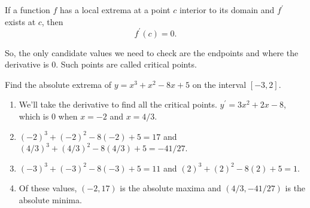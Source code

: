 \begin{theorem}
	If a function $f$ has a local extrema at a point $c$ interior to its domain and $f^\prime$ exists at $c$, then
	\begin{equation*}
		f^\prime(c) = 0.
	\end{equation*}
\end{theorem}

So, the only candidate values we need to check are the endpoints and where the derivative is 0.
Such points are called critical points.

\begin{example}
	Find the absolute extrema of $y = x^3 + x^2 - 8x + 5$ on the interval $[-3,2]$.
\end{example}
\begin{answer}
	\begin{enumerate}
		\item We'll take the derivative to find all the critical points.
				$y^\prime = 3x^2 + 2x - 8$, which is 0 when $x=-2$ and $x=4/3$.
		\item $(-2)^3 + (-2)^2 - 8(-2) + 5 = 17$ and $(4/3)^3 + (4/3)^2 - 8(4/3) + 5 = -41/27$.
		\item $(-3)^3 + (-3)^2 - 8(-3) + 5 = 11$ and $(2)^3 + (2)^2 - 8(2) + 5 = 1$.
		\item Of these values, $(-2,17)$ is the absolute maxima and $(4/3, -41/27)$ is the absolute minima.
	\end{enumerate}
\end{answer}